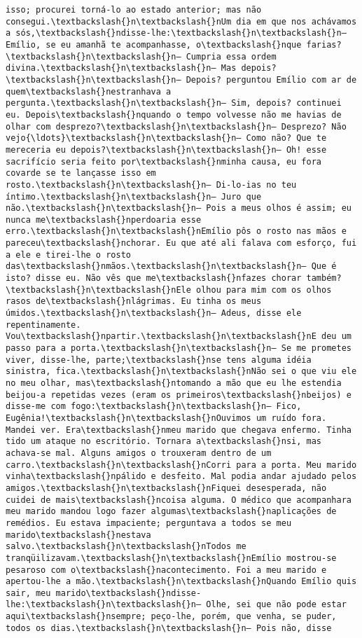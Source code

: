 \documentclass[11pt]{article}
\begin{document}
\begin{Verbatim}[commandchars=\\\{\}]
isso; procurei torná-lo ao estado anterior; mas não consegui.\textbackslash{}n\textbackslash{}nUm dia em que nos achávamos a sós,\textbackslash{}ndisse-lhe:\textbackslash{}n\textbackslash{}n— Emílio, se eu amanhã te acompanhasse, o\textbackslash{}nque farias?\textbackslash{}n\textbackslash{}n— Cumpria essa ordem divina.\textbackslash{}n\textbackslash{}n— Mas depois?\textbackslash{}n\textbackslash{}n— Depois? perguntou Emílio com ar de quem\textbackslash{}nestranhava a pergunta.\textbackslash{}n\textbackslash{}n— Sim, depois? continuei eu. Depois\textbackslash{}nquando o tempo volvesse não me havias de olhar com desprezo?\textbackslash{}n\textbackslash{}n— Desprezo? Não vejo{\ldots}\textbackslash{}n\textbackslash{}n— Como não? Que te mereceria eu depois?\textbackslash{}n\textbackslash{}n— Oh! esse sacrifício seria feito por\textbackslash{}nminha causa, eu fora covarde se te lançasse isso em rosto.\textbackslash{}n\textbackslash{}n— Di-lo-ias no teu íntimo.\textbackslash{}n\textbackslash{}n— Juro que não.\textbackslash{}n\textbackslash{}n— Pois a meus olhos é assim; eu nunca me\textbackslash{}nperdoaria esse erro.\textbackslash{}n\textbackslash{}nEmílio pôs o rosto nas mãos e pareceu\textbackslash{}nchorar. Eu que até ali falava com esforço, fui a ele e tirei-lhe o rosto das\textbackslash{}nmãos.\textbackslash{}n\textbackslash{}n— Que é isto? disse eu. Não vês que me\textbackslash{}nfazes chorar também?\textbackslash{}n\textbackslash{}nEle olhou para mim com os olhos rasos de\textbackslash{}nlágrimas. Eu tinha os meus úmidos.\textbackslash{}n\textbackslash{}n— Adeus, disse ele repentinamente. Vou\textbackslash{}npartir.\textbackslash{}n\textbackslash{}nE deu um passo para a porta.\textbackslash{}n\textbackslash{}n— Se me prometes viver, disse-lhe, parte;\textbackslash{}nse tens alguma idéia sinistra, fica.\textbackslash{}n\textbackslash{}nNão sei o que viu ele no meu olhar, mas\textbackslash{}ntomando a mão que eu lhe estendia beijou-a repetidas vezes (eram os primeiros\textbackslash{}nbeijos) e disse-me com fogo:\textbackslash{}n\textbackslash{}n— Fico, Eugênia!\textbackslash{}n\textbackslash{}nOuvimos um ruído fora. Mandei ver. Era\textbackslash{}nmeu marido que chegava enfermo. Tinha tido um ataque no escritório. Tornara a\textbackslash{}nsi, mas achava-se mal. Alguns amigos o trouxeram dentro de um carro.\textbackslash{}n\textbackslash{}nCorri para a porta. Meu marido vinha\textbackslash{}npálido e desfeito. Mal podia andar ajudado pelos amigos.\textbackslash{}n\textbackslash{}nFiquei desesperada, não cuidei de mais\textbackslash{}ncoisa alguma. O médico que acompanhara meu marido mandou logo fazer algumas\textbackslash{}naplicações de remédios. Eu estava impaciente; perguntava a todos se meu marido\textbackslash{}nestava salvo.\textbackslash{}n\textbackslash{}nTodos me tranqüilizavam.\textbackslash{}n\textbackslash{}nEmílio mostrou-se pesaroso com o\textbackslash{}nacontecimento. Foi a meu marido e apertou-lhe a mão.\textbackslash{}n\textbackslash{}nQuando Emílio quis sair, meu marido\textbackslash{}ndisse-lhe:\textbackslash{}n\textbackslash{}n— Olhe, sei que não pode estar aqui\textbackslash{}nsempre; peço-lhe, porém, que venha, se puder, todos os dias.\textbackslash{}n\textbackslash{}n— Pois não, disse 
\end{Verbatim}
\end{document}
